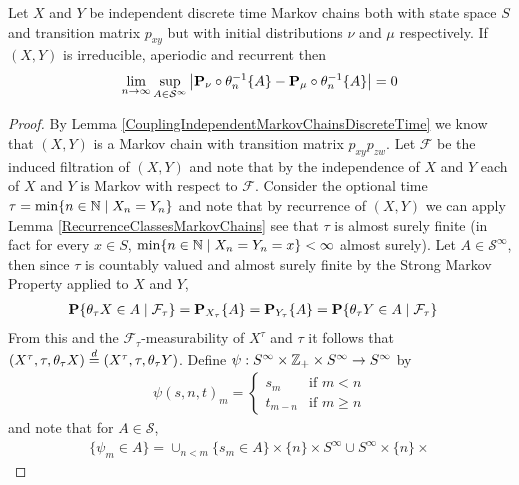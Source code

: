 \begin{lem}\label{StrongErgodicityMarkovChainsDiscreteTime}Let $X$ and $Y$ be independent discrete time Markov chains
  both with state space $S$ and transition matrix $p_{xy}$ but with
  initial distributions $\nu$ and $\mu$ respectively.  If $(X,Y)$ is
  irreducible, aperiodic and recurrent then
\begin{align*}
\lim_{n \to \infty} \sup_{A \in \mathcal{S}^\infty}
  \abs{\pushforward{\theta_n}{\probabilityop_\nu}\lbrace A \rbrace -
  \pushforward{\theta_n}{\probabilityop_\mu}\lbrace A \rbrace} = 0
\end{align*}
\end{lem}
\begin{proof}
By Lemma \ref{CouplingIndependentMarkovChainsDiscreteTime} we know
that $(X,Y)$ is a Markov chain with transition matrix $p_{xy}p_{zw}$.
Let $\mathcal{F}$ be the induced filtration of $(X,Y)$ and note that
by the independence of $X$ and $Y$ 
each of $X$ and $Y$ is
Markov with respect to $\mathcal{F}$.
Consider the optional time $\tau = \min \lbrace n \in \naturals \mid
X_n = Y_n \rbrace$ and note that by recurrence of $(X,Y)$ we can apply
Lemma \ref{RecurrenceClassesMarkovChains} see that $\tau$ is almost
surely finite (in fact for every $x \in S$,  $\min \lbrace n \in \naturals \mid
X_n = Y_n = x\rbrace < \infty$ almost surely).  Let $A \in
\mathcal{S}^\infty$, then since $\tau$ is
countably valued and almost surely finite by the Strong Markov
Property applied to $X$ and $Y$, 
\begin{align*}
\cprobability {\mathcal{F}_\tau} {\theta_\tau X \in A}
&=\sprobability{A}{X_\tau}
=\sprobability{A}{Y_\tau}
=\cprobability {\mathcal{F}_\tau} {\theta_\tau Y \in A}
\end{align*}
From this and the $\mathcal{F}_\tau$-measurability of $X^\tau$ and
$\tau$ it follows that $(X^\tau, \tau, \theta_\tau X) \eqdist (X^\tau,
\tau, \theta_\tau Y)$.  Define 
$\psi : S^\infty \times \integers_+ \times S^\infty \to S^\infty$
by 
\begin{align*}
\psi(s,n,t)_m = \begin{cases}
s_m & \text{if $m < n$} \\
t_{m-n} & \text{if $m \geq n$} 
\end{cases}
\end{align*}
and note that for $A \in \mathcal{S}$, 
\begin{align*}
\lbrace \psi_m \in A \rbrace = 
\cup_{n < m} \lbrace s_m \in A \rbrace \times \lbrace n \rbrace \times
  S^\infty 
\cup 
S^\infty \times \lbrace n \rbrace \times

\end{align*}
\end{proof}
